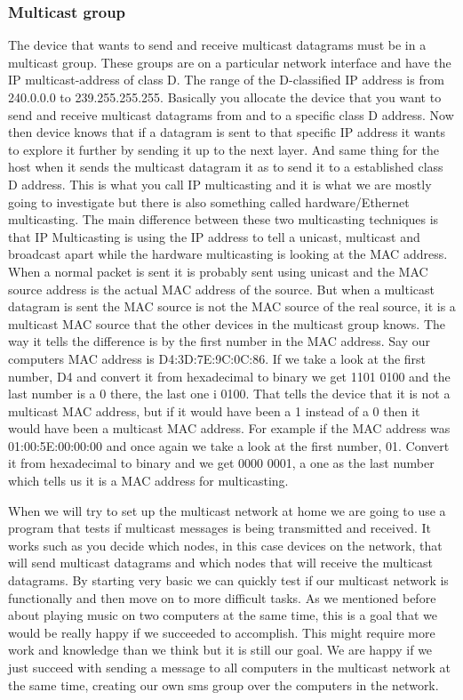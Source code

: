 \documentclass[9pt,a4paper]{acmproc}
\begin{document}
\subsubsection{Multicast group}

The device that wants to send and receive multicast datagrams must be in a multicast group. These groups are on a particular network interface and have the IP multicast-address of class D. The range of the D-classified IP address is from 240.0.0.0 to 239.255.255.255. Basically you allocate the device that you want to send and receive multicast datagrams from and to a specific class D address. Now then device knows that if a datagram is sent to that specific IP address it wants to explore it further by sending it up to the next layer. And same thing for the host when it sends the multicast datagram it as to send it to a established class D address. This is what you call IP multicasting and it is what we are mostly going to investigate but there is also something called hardware/Ethernet multicasting. The main difference between these two multicasting techniques is that IP Multicasting is using the IP address to tell a unicast, multicast and broadcast apart while the hardware multicasting is looking at the MAC address. When a normal packet is sent it is probably sent using unicast and the MAC source address is the actual MAC address of the source. But when a multicast datagram is sent the MAC source is not the MAC source of the real source, it is a multicast MAC source that the other devices in the multicast group knows. The way it tells the difference is by the first number in the MAC address. Say our computers MAC address is D4:3D:7E:9C:0C:86. If we take a look at the first number, D4 and convert it from hexadecimal to binary we get 1101 0100 and the last number is a 0 there, the last one i 0100. That tells the device that it is not a multicast MAC address, but if it would have been a 1 instead of a 0 then it would have been a multicast MAC address. For example if the MAC address was 01:00:5E:00:00:00 and once again we take a look at the first number, 01. Convert it from hexadecimal to binary and we get 0000 0001, a one as the last number which tells us it is a MAC address for multicasting.

When we will try to set up the multicast network at home we are going to use a program that tests if multicast messages is being transmitted and received. It works such as you decide which nodes, in this case devices on the network, that will send multicast datagrams and which nodes that will receive the multicast datagrams. By starting very basic we can quickly test if our multicast network is functionally and then move on to more difficult tasks. As we mentioned before about playing music on two computers at the same time, this is a goal that we would be really happy if we succeeded to accomplish. This might require more work and knowledge than we think but it is still our goal. We are happy if we just succeed with sending a message to all computers in the multicast network at the same time, creating our own sms group over the computers in the network.
\end{document}
